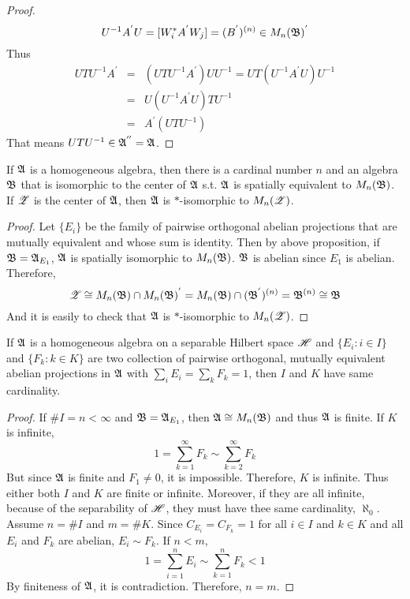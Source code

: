 \begin{proof}
	\begin{equation*}
		U^{-1} A^{'}U = [W_i^{*}A^{'}W_j] = (B^{'})^{(n)} \in M_n(\mathfrak{B})^{'}
	\end{equation*}
	Thus 
	\begin{eqnarray*}
		U TU^{-1} A^{'}  &=& (U TU^{-1} A^{'}) U U^{-1} = U T(U^{-1} A^{'} U) U^{-1} \\
		&=& U (U^{-1} A^{'} U)T U^{-1} \\
		&=& A^{'} (UT U^{-1})
	\end{eqnarray*}
	That means $UT U^{-1} \in \mathfrak{A}^{''} = \mathfrak{A}$.
\end{proof}

\begin{cor}
	If $\mathfrak{A}$ is a homogeneous algebra, then there is a cardinal number $n$ and an algebra $\mathfrak{B}$ that is isomorphic to the center of $\mathfrak{A}$ s.t. $\mathfrak{A}$ is spatially equivalent to $M_n(\mathfrak{B})$. If $\mathscr{Z}$ is the center of $\mathfrak{A}$, then $\mathfrak{A}$ is $*$-isomorphic to $M_n(\mathscr{Z})$.
\end{cor}
\begin{proof}
	Let $\{E_i\}$ be the family of pairwise orthogonal abelian projections that are mutually equivalent and whose sum is identity. Then by above proposition, if $\mathfrak{B} = \mathfrak{A}_{E_1}$, $\mathfrak{A}$ is spatially isomorphic to $M_n(\mathfrak{B})$. $\mathfrak{B}$ is abelian since $E_1$ is abelian. Therefore,
	\begin{equation*}
		\mathscr{Z} \cong M_n(\mathfrak{B}) \cap M_n(\mathfrak{B})^{'} = M_n(\mathfrak{B}) \cap (\mathfrak{B}^{'})^{(n)} = \mathfrak{B}^{(n)} \cong \mathfrak{B}
	\end{equation*}
	And it is easily to check that $\mathfrak{A}$ is $*$-isomorphic to $M_n(\mathscr{Z})$.
\end{proof}

\begin{prop}
	If $\mathfrak{A}$ is a homogeneous algebra on a separable Hilbert space $\mathscr{H}$ and $\{E_i \colon i \in I\}$ and $\{F_k \colon k \in K\}$ are two collection of pairwise orthogonal, mutually equivalent abelian projections in $\mathfrak{A}$ with $\sum_i E_i = \sum_k F_k = 1$, then $I$ and $K$ have same cardinality.
\end{prop}
\begin{proof}
	If $\#I = n < \infty$ and $\mathfrak{B} = \mathfrak{A}_{E_1}$, then $\mathfrak{A} \cong M_n(\mathfrak{B})$ and thus $\mathfrak{A}$ is finite. If $K$ is infinite, 
	\begin{equation*}
		1 = \sum_{k=1}^{\infty} F_k \sim \sum_{k=2}^{\infty} F_k
	\end{equation*}
	But since $\mathfrak{A}$ is finite and $F_1 \neq 0$, it is  impossible. Therefore, $K$ is infinite. Thus either both $I$ and $K$ are finite or infinite. Moreover, if they are all infinite, because of the separability of $\mathscr{H}$, they must have thee same cardinality, $\aleph_0$.\\
	Assume $n = \#I$ and $m = \#K$. Since $C_{E_i} = C_{F_k} = 1$ for all $i \in I$ and $k \in K$ and all $E_i$ and $F_k$ are abelian, $E_i \sim F_k$. If $n < m$,
	\begin{equation*}
		1 = \sum_{i=1}^{n} E_i \sim \sum_{k=1}^n F_k < 1
	\end{equation*}
	By finiteness of $\mathfrak{A}$, it is contradiction. Therefore, $n = m$.
\end{proof}

